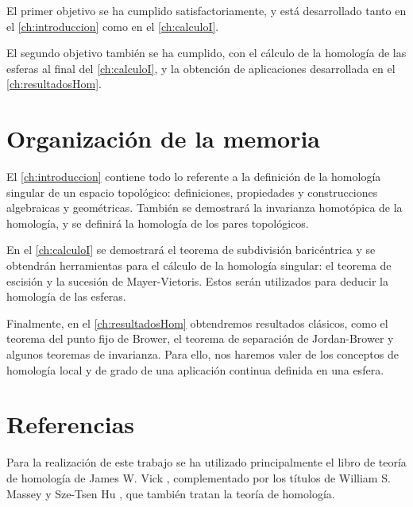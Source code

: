 El primer objetivo se ha cumplido satisfactoriamente, y está desarrollado tanto en el
\autoref{ch:introduccion} como en el \autoref{ch:calculoI}.

El segundo objetivo también se ha cumplido, con el cálculo de la homología de las esferas
al final del \autoref{ch:calculoI}, y la obtención de aplicaciones desarrollada en el
\autoref{ch:resultadosHom}.

\section{Organización de la memoria}

El \autoref{ch:introduccion} contiene todo lo referente a la definición de la homología
singular de un espacio topológico: definiciones, propiedades y construcciones algebraicas
y geométricas. También se demostrará la invarianza homotópica de la homología, y se
definirá la homología de los pares topológicos.

En el \autoref{ch:calculoI} se demostrará el teorema de subdivisión baricéntrica y
se obtendrán herramientas para el cálculo de la homología singular: el teorema
de escisión y la sucesión de Mayer-Vietoris. Estos serán utilizados para deducir
la homología de las esferas.

Finalmente, en el \autoref{ch:resultadosHom} obtendremos resultados clásicos, como el
teorema del punto fijo de Brower, el teorema de separación de Jordan-Brower y algunos
teoremas de invarianza. Para ello, nos haremos valer de los conceptos de homología
local y de grado de una aplicación continua definida en una esfera.

\section{Referencias}

Para la realización de este trabajo se ha utilizado principalmente el libro de
teoría de homología de James W. Vick \citep{vick:1973}, complementado por los títulos
de William S. Massey \citep{massey:1972} y Sze-Tsen Hu \citep{hu:1966}, que también
tratan la teoría de homología.
